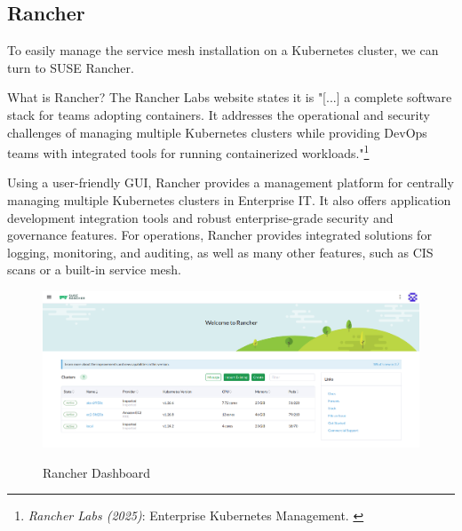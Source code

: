 \subsection{Rancher}

To easily manage the service mesh installation on a Kubernetes cluster, we can turn to SUSE Rancher.

What is Rancher? The Rancher Labs website states it is "[...] a complete software stack for teams adopting containers. It addresses the operational and security challenges of managing multiple Kubernetes clusters while providing DevOps teams with integrated tools for running containerized workloads."\footnote{\textit{Rancher Labs (2025)}: Enterprise Kubernetes Management. \cite{rancher}}

Using a user-friendly GUI, Rancher provides a management platform for centrally managing multiple Kubernetes clusters in Enterprise IT. It also offers application development integration tools and robust enterprise-grade security and governance features. For operations, Rancher provides integrated solutions for logging, monitoring, and auditing, as well as many other features, such as CIS scans or a built-in service mesh.

\begin{figure}[H]
\centering
\caption {Rancher Dashboard}
\includegraphics[width=\linewidth]{images/rancher-dashboard.png}
\label{fig:rancherDashboard}
\end{figure}
